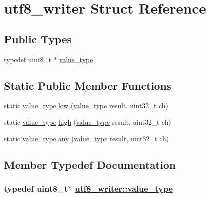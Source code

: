 \hypertarget{structutf8__writer}{
\section{utf8\_\-writer Struct Reference}
\label{structutf8__writer}
}
\subsection*{Public Types}
\begin{CompactItemize}
\item 
typedef uint8\_\-t $\ast$ \hyperlink{structutf8__writer_f25ec3c651f9a4a3f193573a4e95002b}{value\_\-type}
\end{CompactItemize}
\subsection*{Static Public Member Functions}
\begin{CompactItemize}
\item 
static \hyperlink{structutf8__writer_f25ec3c651f9a4a3f193573a4e95002b}{value\_\-type} \hyperlink{structutf8__writer_c4ec52da6f37225ba4fde259bff2f86c}{low} (\hyperlink{structutf8__writer_f25ec3c651f9a4a3f193573a4e95002b}{value\_\-type} result, uint32\_\-t ch)
\item 
static \hyperlink{structutf8__writer_f25ec3c651f9a4a3f193573a4e95002b}{value\_\-type} \hyperlink{structutf8__writer_c03dfaf797d599afdf0be7def86ff9b9}{high} (\hyperlink{structutf8__writer_f25ec3c651f9a4a3f193573a4e95002b}{value\_\-type} result, uint32\_\-t ch)
\item 
static \hyperlink{structutf8__writer_f25ec3c651f9a4a3f193573a4e95002b}{value\_\-type} \hyperlink{structutf8__writer_288e9c5f3720b95ae6b77330ad38dd56}{any} (\hyperlink{structutf8__writer_f25ec3c651f9a4a3f193573a4e95002b}{value\_\-type} result, uint32\_\-t ch)
\end{CompactItemize}


\subsection{Member Typedef Documentation}
\hypertarget{structutf8__writer_f25ec3c651f9a4a3f193573a4e95002b}{
\subsubsection[value\_\-type]{\setlength{\rightskip}{0pt plus 5cm}typedef uint8\_\-t$\ast$ \hyperlink{structutf8__writer_f25ec3c651f9a4a3f193573a4e95002b}{utf8\_\-writer::value\_\-type}}}
\label{structutf8__writer_f25ec3c651f9a4a3f193573a4e95002b}




